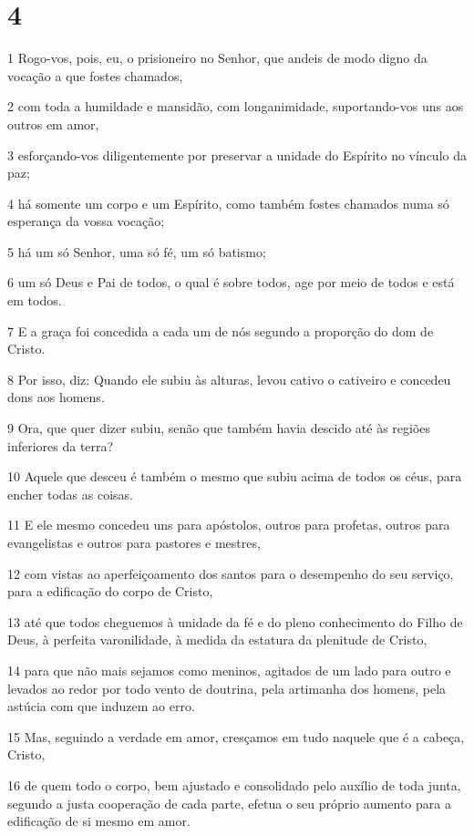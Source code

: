 \chapter{4}

\par 1 Rogo-vos, pois, eu, o prisioneiro no Senhor, que andeis de modo digno da vocação a que fostes chamados,
\par 2 com toda a humildade e mansidão, com longanimidade, suportando-vos uns aos outros em amor,
\par 3 esforçando-vos diligentemente por preservar a unidade do Espírito no vínculo da paz;
\par 4 há somente um corpo e um Espírito, como também fostes chamados numa só esperança da vossa vocação;
\par 5 há um só Senhor, uma só fé, um só batismo;
\par 6 um só Deus e Pai de todos, o qual é sobre todos, age por meio de todos e está em todos.
\par 7 E a graça foi concedida a cada um de nós segundo a proporção do dom de Cristo.
\par 8 Por isso, diz: Quando ele subiu às alturas, levou cativo o cativeiro e concedeu dons aos homens.
\par 9 Ora, que quer dizer subiu, senão que também havia descido até às regiões inferiores da terra?
\par 10 Aquele que desceu é também o mesmo que subiu acima de todos os céus, para encher todas as coisas.
\par 11 E ele mesmo concedeu uns para apóstolos, outros para profetas, outros para evangelistas e outros para pastores e mestres,
\par 12 com vistas ao aperfeiçoamento dos santos para o desempenho do seu serviço, para a edificação do corpo de Cristo,
\par 13 até que todos cheguemos à unidade da fé e do pleno conhecimento do Filho de Deus, à perfeita varonilidade, à medida da estatura da plenitude de Cristo,
\par 14 para que não mais sejamos como meninos, agitados de um lado para outro e levados ao redor por todo vento de doutrina, pela artimanha dos homens, pela astúcia com que induzem ao erro.
\par 15 Mas, seguindo a verdade em amor, cresçamos em tudo naquele que é a cabeça, Cristo,
\par 16 de quem todo o corpo, bem ajustado e consolidado pelo auxílio de toda junta, segundo a justa cooperação de cada parte, efetua o seu próprio aumento para a edificação de si mesmo em amor.
